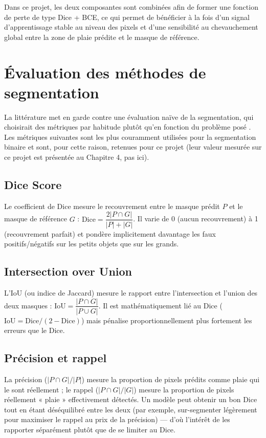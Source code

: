 \documentclass[12pt,a4paper]{report}
\begin{document}
Dans ce projet, les deux composantes sont combinées afin de former une fonction de perte de type Dice + BCE, ce qui permet de bénéficier à la fois d'un signal d'apprentissage stable au niveau des pixels et d'une sensibilité au chevauchement global entre la zone de plaie prédite et le masque de référence.

\section{Évaluation des méthodes de segmentation}
\label{sec:metriques}

La littérature met en garde contre une évaluation naïve de la segmentation, qui choisirait des métriques par habitude plutôt qu'en fonction du problème posé \cite{ref6,ref7}. Les métriques suivantes sont les plus couramment utilisées pour la segmentation binaire et sont, pour cette raison, retenues pour ce projet (leur valeur mesurée sur ce projet est présentée au Chapitre 4, pas ici).

\subsection{Dice Score}

Le coefficient de Dice mesure le recouvrement entre le masque prédit $P$ et le masque de référence $G$ : $\text{Dice} = \dfrac{2 |P \cap G|}{|P| + |G|}$. Il varie de 0 (aucun recouvrement) à 1 (recouvrement parfait) et pondère implicitement davantage les faux positifs/négatifs sur les petits objets que sur les grands.

\subsection{Intersection over Union}

L'IoU (ou indice de Jaccard) mesure le rapport entre l'intersection et l'union des deux masques : $\text{IoU} = \dfrac{|P \cap G|}{|P \cup G|}$. Il est mathématiquement lié au Dice ($\text{IoU} = \text{Dice} / (2 - \text{Dice})$) mais pénalise proportionnellement plus fortement les erreurs que le Dice.

\subsection{Précision et rappel}

La précision ($|P \cap G| / |P|$) mesure la proportion de pixels prédits comme plaie qui le sont réellement ; le rappel ($|P \cap G| / |G|$) mesure la proportion de pixels réellement « plaie » effectivement détectés. Un modèle peut obtenir un bon Dice tout en étant déséquilibré entre les deux (par exemple, sur-segmenter légèrement pour maximiser le rappel au prix de la précision) — d'où l'intérêt de les rapporter séparément plutôt que de se limiter au Dice.
\end{document}
